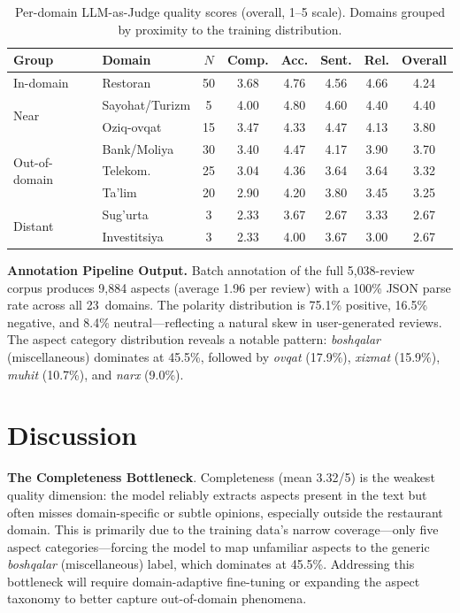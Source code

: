 \documentclass[computers,article,submit,pdftex,moreauthors]{Definitions/mdpi}
\begin{document}
\begin{table}[t]
\centering
\caption{Per-domain LLM-as-Judge quality scores (overall, 1--5 scale). Domains grouped by proximity to the training distribution.}
\label{tab:domain_quality}
\setlength{\tabcolsep}{4pt}
\begin{tabular}{llcccccc}
\toprule
\textbf{Group} & \textbf{Domain} & $N$ & \textbf{Comp.} & \textbf{Acc.} & \textbf{Sent.} & \textbf{Rel.} & \textbf{Overall} \\
\midrule
In-domain    & Restoran       & 50 & 3.68 & 4.76 & 4.56 & 4.66 & 4.24 \\
\midrule
\multirow{2}{*}{Near}
             & Sayohat/Turizm & 5  & 4.00 & 4.80 & 4.60 & 4.40 & 4.40 \\
             & Oziq-ovqat     & 15 & 3.47 & 4.33 & 4.47 & 4.13 & 3.80 \\
\midrule
\multirow{3}{*}{Out-of-domain}
             & Bank/Moliya    & 30 & 3.40 & 4.47 & 4.17 & 3.90 & 3.70 \\
             & Telekom.       & 25 & 3.04 & 4.36 & 3.64 & 3.64 & 3.32 \\
             & Ta'lim         & 20 & 2.90 & 4.20 & 3.80 & 3.45 & 3.25 \\
\midrule
\multirow{2}{*}{Distant}
             & Sug'urta       & 3  & 2.33 & 3.67 & 2.67 & 3.33 & 2.67 \\
             & Investitsiya   & 3  & 2.33 & 4.00 & 3.67 & 3.00 & 2.67 \\
\bottomrule
\end{tabular}
\end{table}

\textbf{Annotation Pipeline Output.} Batch annotation of the full 5{,}038-review corpus produces 9{,}884 aspects (average 1.96 per review) with a 100\% JSON parse rate across all 23~domains. The polarity distribution is 75.1\% positive, 16.5\% negative, and 8.4\% neutral---reflecting a natural skew in user-generated reviews. The aspect category distribution reveals a notable pattern: \emph{boshqalar} (miscellaneous) dominates at 45.5\%, followed by \emph{ovqat} (17.9\%), \emph{xizmat} (15.9\%), \emph{muhit} (10.7\%), and \emph{narx} (9.0\%).



\section{Discussion}
\label{sec:discussion}

\textbf{The Completeness Bottleneck}. Completeness (mean 3.32/5) is the weakest quality dimension: the model reliably extracts aspects present in the text but often misses domain-specific or subtle opinions, especially outside the restaurant domain. This is primarily due to the training data's narrow coverage---only five aspect categories---forcing the model to map unfamiliar aspects to the generic \textit{boshqalar} (miscellaneous) label, which dominates at 45.5\%. Addressing this bottleneck will require domain-adaptive fine-tuning or expanding the aspect taxonomy to better capture out-of-domain phenomena.
\end{document}
